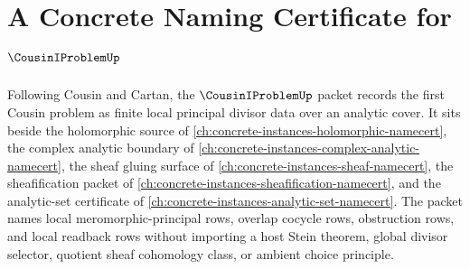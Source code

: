 \chapter{A Concrete Naming Certificate for $\CousinIProblemUp$}
\label{ch:concrete-instances-cousin-i-problem-namecert}

Following Cousin and Cartan, the $\CousinIProblemUp$ packet records the first Cousin problem as finite local principal divisor data over an analytic cover. It sits beside the holomorphic source of \autoref{ch:concrete-instances-holomorphic-namecert}, the complex analytic boundary of \autoref{ch:concrete-instances-complex-analytic-namecert}, the sheaf gluing surface of \autoref{ch:concrete-instances-sheaf-namecert}, the sheafification packet of \autoref{ch:concrete-instances-sheafification-namecert}, and the analytic-set certificate of \autoref{ch:concrete-instances-analytic-set-namecert}. The packet names local meromorphic-principal rows, overlap cocycle rows, obstruction rows, and local readback rows without importing a host Stein theorem, global divisor selector, quotient sheaf cohomology class, or ambient choice principle.

